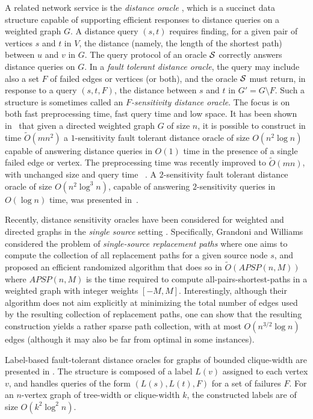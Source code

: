 \documentclass[12pt]{article}
\newcommand{\Ot}{\tilde{O}}
\newcommand{\cS}[0]{{\cal S}}
\begin{document}
A related network service is the {\em distance oracle} \cite{BS06,RTZ05,TZ05},
which is a succinct data structure capable of supporting
efficient responses to distance queries on a weighted graph $G$.
A distance query $(s,t)$ requires finding,
for a given pair of vertices $s$ and $t$ in $V$, the distance
(namely, the length of the shortest path) between $u$ and $v$ in $G$.
The query protocol of an oracle $\cS$ correctly answers distance queries on $G$.
In a {\em fault tolerant distance oracle}, the query
may include also a set $F$ of failed edges or vertices (or both),
and the oracle $\cS$ must return, in response to a query $(s,t,F)$,
the distance between $s$ and $t$ in $G'=G\setminus F$.
Such a structure is sometimes called an {\em $F$-sensitivity distance oracle}.
The focus is on both fast preprocessing time, fast query time and low space.
It has been shown in~\cite{DTCR08} that given a directed weighted graph $G$
of size $n$, it is possible to construct in time $\Ot(mn^2)$
a $1$-sensitivity fault tolerant distance oracle of size $O(n^2 \log n)$
capable of answering distance queries in $O(1)$ time in the presence
of a single failed edge or vertex.
The preprocessing time was recently improved to $\Ot(mn)$,
with unchanged size and query time ~\cite{BK09}.
A $2$-sensitivity fault tolerant distance oracle of size $O(n^2 \log^3 n)$,
capable of answering $2$-sensitivity queries in $O(\log n)$ time,
was presented in~\cite{DP09}.
\par
Recently, distance sensitivity oracles have been considered for weighted
and directed graphs in the \emph{single source} setting \cite{GW12}.
Specifically, Grandoni and Williams considered the problem of
\emph{single-source replacement paths} where one aims to compute
the collection of all replacement paths for a given source node $s$,
and proposed an efficient randomized algorithm that does so in
$\widetilde{O}(APSP(n,M))$ where $APSP(n,M)$ is the time required to compute
all-pairs-shortest-paths in a weighted graph with integer weights $[-M,M]$.
Interestingly, although their algorithm does not aim explicitly at minimizing
the total number of edges used by the resulting collection of
replacement paths, one can show that the resulting construction yields
a rather sparse path collection, with at most $O(n^{3/2}\log n)$ edges
(although it may also be far from optimal in some instances).


Label-based fault-tolerant distance oracles for graphs of bounded clique-width
are presented in \cite{CT07}. The structure is composed of a label $L(v)$
assigned to each vertex $v$, and handles queries of the form $(L(s),L(t),F)$
for a set of failures $F$. For an $n$-vertex graph of tree-width or
clique-width $k$, the constructed labels are of size $O(k^2 \log^2 n)$.
\end{document}
